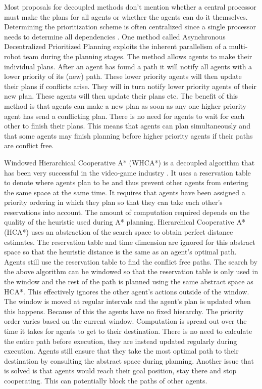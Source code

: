 Most proposals for decoupled methods don't mention whether a central processor
must make the plans for all agents or whether the agents can do it themselves.
Determining the prioritization scheme is often centralized since a
single processor needs to determine all dependencies \cite{bennewitz2002}. One
method called Asynchronous Decentralized Prioritized Planning \cite{cap2012}
exploits the inherent parallelism of a multi-robot team during the planning
stages. The method allows
agents to make their individual plans. After an agent has found a path it will
notify all agents with a lower priority of its (new) path. These lower priority
agents will then update their plans if conflicts arise. They will in turn
notify lower priority agents of their new plan. These agents will then update
their plans etc. The benefit of
this method is that agents can make a new plan as soon as any one higher
priority agent has send a conflicting plan. There is no need for agents to
wait for each other to finish their plans. This means that agents can plan
simultaneously and that some agents may finish planning before higher priority
agents if their paths are conflict free.

Windowed Hierarchical Cooperative A* (WHCA*) is a decoupled algorithm that has
been very successful in the video-game industry \cite{silver2005}. It uses a
reservation table to denote where agents plan to be and thus prevent other
agents from entering the same space at the same time. It requires that agents
have been assigned a priority ordering in which they plan so that they can take
each other's reservations into account. The amount of computation required
depends on the quality of the heuristic used during A* planning. Hierarchical
Cooperative A* (HCA*) uses an abstraction of the search space to obtain perfect
distance estimates. The reservation table and time dimension are ignored for
this abstract space so that the heuristic distance is the same as an agent's
optimal path. Agents still use the reservation table to find the conflict free
paths. The search by the above algorithm can be windowed so that the
reservation table is only used in the window and the rest of the path is
planned using the same abstract space as HCA*. This effectively ignores the
other agent's actions outside of the window. The window is moved at regular
intervals and the agent's plan is updated when this happens. Because of this
the agents have no fixed hierarchy. The priority order varies based on the
current window. Computation is spread out over the time it takes for agents to
get to their destination. There is no need to calculate the entire path before
execution, they are instead updated regularly during execution. Agents still
ensure that they take the most optimal path to their destination by consulting
the abstract space during planning. Another issue that is solved is that agents
would reach their goal position, stay there and stop cooperating. This can
potentially block the paths of other agents.

